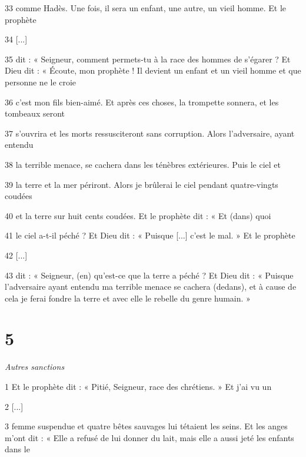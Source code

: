 \par 33 comme Hadès. Une fois, il sera un enfant, une autre, un vieil homme. Et le prophète

\par 34 [...]

\par 35 dit : « Seigneur, comment permets-tu à la race des hommes de s'égarer ? Et Dieu dit : « Écoute, mon prophète ! Il devient un enfant et un vieil homme et que personne ne le croie

\par 36 c'est mon fils bien-aimé. Et après ces choses, la trompette sonnera, et les tombeaux seront

\par 37 s'ouvrira et les morts ressusciteront sans corruption. Alors l'adversaire, ayant entendu

\par 38 la terrible menace, se cachera dans les ténèbres extérieures. Puis le ciel et

\par 39 la terre et la mer périront. Alors je brûlerai le ciel pendant quatre-vingts coudées

\par 40 et la terre sur huit cents coudées. Et le prophète dit : « Et (dans) quoi

\par 41 le ciel a-t-il péché ? Et Dieu dit : « Puisque [...] c'est le mal. » Et le prophète

\par 42 [...]

\par 43 dit : « Seigneur, (en) qu'est-ce que la terre a péché ? Et Dieu dit : « Puisque l’adversaire ayant entendu ma terrible menace se cachera (dedans), et à cause de cela je ferai fondre la terre et avec elle le rebelle du genre humain. »

\chapter{5}

\par \textit{Autres sanctions}

\par 1 Et le prophète dit : « Pitié, Seigneur, race des chrétiens. » Et j'ai vu un

\par 2 [...]

\par 3 femme suspendue et quatre bêtes sauvages lui tétaient les seins. Et les anges m'ont dit : « Elle a refusé de lui donner du lait, mais elle a aussi jeté les enfants dans le

